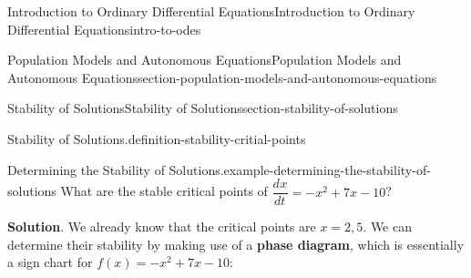 \documentclass[oneside,10pt,]{book}
\newcommand{\terminology}[1]{\textbf{#1}}
\numberwithin{equation}{section}
\newcommand{\dv}[3][]{\dfrac{d^{#1} #2}{d #3^{#1}}}
\begin{document}
\begin{chapterptx}{Introduction to Ordinary Differential Equations}{}{Introduction to Ordinary Differential Equations}{}{}{intro-to-odes}
\begin{sectionptx}{Population Models and Autonomous Equations}{}{Population Models and Autonomous Equations}{}{}{section-population-models-and-autonomous-equations}
\begin{subsectionptx}{Stability of Solutions}{}{Stability of Solutions}{}{}{section-stability-of-solutions}
\begin{definition}{Stability of Solutions.}{definition-stability-critial-points}
\end{definition}
\begin{example}{Determining the Stability of Solutions.}{example-determining-the-stability-of-solutions}%
\hypertarget{p-125}{}%
What are the stable critical points of \(\dv{x}{t} = -x^{2} + 7x - 10\)?%
\par\smallskip%
\noindent\textbf{Solution}.\hypertarget{solution-21}{}\quad%
\hypertarget{p-126}{}%
We already know that the critical points are \(x = 2, 5\). We can determine their stability by making use of a \terminology{phase diagram}, which is essentially a sign chart for \(f(x) = -x^{2} + 7x - 10\):%
\begin{figure}
\centering
{
}
\end{figure}
\end{example}
\end{subsectionptx}
\end{sectionptx}
\end{chapterptx}
\end{document}
